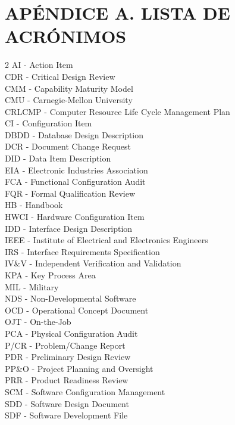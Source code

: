 ﻿\section{APÉNDICE A. LISTA DE ACRÓNIMOS}
\begin{multicols}{2}
AI - Action Item \\
CDR - Critical Design Review \\
CMM - Capability Maturity Model \\
CMU - Carnegie-Mellon University \\
CRLCMP - Computer Resource Life Cycle Management Plan \\
CI - Configuration Item \\
DBDD - Database Design Description \\
DCR - Document Change Request \\
DID - Data Item Description \\
EIA - Electronic Industries Association \\
FCA - Functional Configuration Audit \\
FQR - Formal Qualification Review \\
HB - Handbook \\
HWCI - Hardware Configuration Item \\
IDD - Interface Design Description \\
IEEE - Institute of Electrical and Electronics Engineers \\
IRS - Interface Requirements Specification \\
IV\&V - Independent Verification and Validation \\
KPA - Key Process Area \\
MIL - Military \\
NDS - Non-Developmental Software \\
OCD - Operational Concept Document \\
OJT - On-the-Job \\
PCA - Physical Configuration Audit \\
P/CR - Problem/Change Report \\
PDR - Preliminary Design Review \\
PP\&O - Project Planning and Oversight \\
PRR - Product Readiness Review \\
SCM - Software Configuration Management \\
SDD - Software Design Document \\
SDF - Software Development File \\

\end{multicols}
